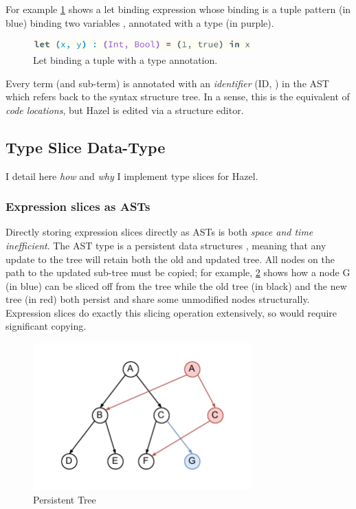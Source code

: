 For example \cref{fig:tupletermstructure} shows a let binding expression whose binding is a tuple pattern (in blue) binding two variables ,  annotated with a type (in purple).

\begin{figure}[h]
\center\includegraphics[width=0.75\textwidth]{Media/Figures/tuple_term_structure}
\caption{Let binding a tuple with a type annotation.}
\label{fig:tupletermstructure}
\end{figure}

Every term (and sub-term) is annotated with an \textit{identifier} (ID, ) in the AST which refers back to the syntax structure tree. In a sense, this is the equivalent of \textit{code locations}, but Hazel is edited via a structure editor. 
\subsection{Type Slice Data-Type}\label{sec:TypeSliceDataType}
I detail here \textit{how} and \textit{why} I implement type slices for Hazel.

\subsubsection{Expression slices as ASTs}

Directly storing expression slices directly as ASTs is both \textit{space and time inefficient}. The AST type is a persistent data structures \cite[ch. 2]{PurelyFunctionalDataStructures}, meaning that any update to the tree will retain both the old and updated tree. All nodes on the path to the updated sub-tree must be copied; for example, \cref{fig:PersistentTrees} shows how a node G (in blue) can be sliced off from the tree while the old tree (in black) and the new tree (in red) both persist and share some unmodified nodes structurally. Expression slices do exactly this slicing operation extensively, so would require significant copying.
\begin{figure}[h]
\center\includegraphics[width=0.75\textwidth]{Media/Figures/persistenttree}
\caption{Persistent Tree}
\label{fig:PersistentTrees}
\end{figure}

